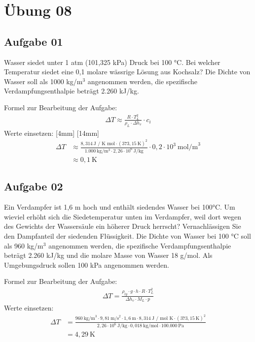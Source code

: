 \documentclass[a4paper,10pt]{article}
\begin{document}
\sidebar
{}
\par \vspace*{5mm}


\section*{Übung 08}

\subsection*{Aufgabe 01}
Wasser siedet unter 1 atm (101,325 kPa) Druck bei 100 °C. Bei welcher Temperatur siedet
eine 0,1 molare wässrige Lösung aus Kochsalz? Die Dichte von Wasser soll als 1000 kg/m$^3$
angenommen werden, die spezifische Verdampfungsenthalpie beträgt 2.260 kJ/kg. 

\pp

Formel zur Bearbeitung der Aufgabe:
\begin{align*}
\Delta T \approx \frac{R \cdot T_L^2}{\rho_L \cdot \Delta h_v} \cdot c_i
\end{align*}
Werte einsetzen:
\reversemarginpar
{}[4mm]
[14mm]
\begin{align*}
\Delta T &\approx \frac{8,314 ~\text{J / K mol} \cdot (373,15 ~\text{K})^2}{1.000 ~\text{kg/m$^3$} \cdot 2,26 \cdot 10^6 ~\text{J/kg}} \cdot 0,2 \cdot 10^{3}~\text{mol/m}^3 \\
&\approx 0,1 ~\text{K}
\end{align*}
\subsection*{Aufgabe 02}
Ein Verdampfer ist 1,6 m hoch und enthält siedendes Wasser bei 100°C. Um wieviel erhöht
sich die Siedetemperatur unten im Verdampfer, weil dort wegen des Gewichts der
Wassersäule ein höherer Druck herrscht? Vernachlässigen Sie den Dampfanteil der
siedenden Flüssigkeit. Die Dichte von Wasser bei 100 °C soll als 960 kg/m$^3$
 angenommen werden, die spezifische Verdampfungsenthalpie beträgt 2.260 kJ/kg und die molare Masse
von Wasser 18 g/mol. Als Umgebungsdruck sollen 100 kPa angenommen werden. 

Formel zur Bearbeitung der Aufgabe:
\begin{align*}
\Delta T = \frac{\rho_{lg} \cdot g \cdot h \cdot R \cdot T_L^2}{\Delta h_{v} \cdot M_L \cdot p}
\end{align*}
Werte einsetzen:
\begin{align*}
\Delta T &= \frac{960 ~\text{kg/m}^3 \cdot 9,81 ~\text{m/s}^2 \cdot 1,6 ~\text{m} \cdot 8,314 ~\text{J / mol K} \cdot (373,15 ~\text{K})^2}{2,26 \cdot 10^6 ~\text{J/kg} \cdot 0,018 ~\text{kg/mol} \cdot 100.000 ~\text{Pa}} \\
&= 4,29 ~\text{K} 
\end{align*}
\end{document}
